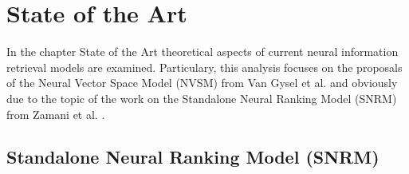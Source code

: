 \chapter{State of the Art} \label{chapter:state-of-the-art}

In the chapter State of the Art theoretical aspects of current neural 
    information retrieval models are examined.
Particulary, this analysis focuses on the proposals of the
    Neural Vector Space Model (NVSM) from
    Van Gysel et al. \cite{van-gysel:2017:neural-vector-spaces}
    and obviously due to the topic of the work on the
    Standalone Neural Ranking Model (SNRM) from 
    Zamani et al. \cite{zamani:2018:from-neural-reranking-to-neural-ranking}.

\section{Standalone Neural Ranking Model (SNRM)}

